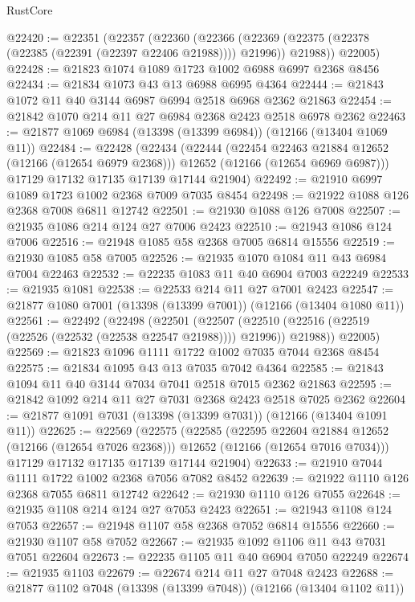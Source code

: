 \begin{lexlean}{RustCore}
\begin{coremodule}
@22420 := @22351
    (@22357
      (@22360
        (@22366 (@22369 (@22375 (@22378 (@22385 (@22391 (@22397 @22406 @21988)))) @21996)) @21988))
      @22005)
@22428 := @21823 @1074 @1089 @1723 @1002 @6988 @6997 @2368 @8456
@22434 := @21834 @1073 @43 @13 @6988 @6995 @4364
@22444 := @21843 @1072 @11 @40 @3144 @6987 @6994 @2518 @6968 @2362 @21863
@22454 := @21842 @1070 @214 @11 @27 @6984 @2368 @2423 @2518 @6978 @2362
@22463 := @21877 @1069 @6984 (@13398 (@13399 @6984)) (@12166 (@13404 @1069 @11))
@22484 := @22428
    (@22434
      (@22444
        (@22454 @22463 @21884 @12652 (@12166 (@12654 @6979 @2368)))
        @12652
        (@12166 (@12654 @6969 @6987)))
      @17129
      @17132
      @17135
      @17139
      @17144
      @21904)
@22492 := @21910 @6997 @1089 @1723 @1002 @2368 @7009 @7035 @8454
@22498 := @21922 @1088 @126 @2368 @7008 @6811 @12742
@22501 := @21930 @1088 @126 @7008
@22507 := @21935 @1086 @214 @124 @27 @7006 @2423
@22510 := @21943 @1086 @124 @7006
@22516 := @21948 @1085 @58 @2368 @7005 @6814 @15556
@22519 := @21930 @1085 @58 @7005
@22526 := @21935 @1070 @1084 @11 @43 @6984 @7004 @22463
@22532 := @22235 @1083 @11 @40 @6904 @7003 @22249
@22533 := @21935 @1081
@22538 := @22533 @214 @11 @27 @7001 @2423
@22547 := @21877 @1080 @7001 (@13398 (@13399 @7001)) (@12166 (@13404 @1080 @11))
@22561 := @22492
    (@22498
      (@22501
        (@22507 (@22510 (@22516 (@22519 (@22526 (@22532 (@22538 @22547 @21988)))) @21996)) @21988))
      @22005)
@22569 := @21823 @1096 @1111 @1722 @1002 @7035 @7044 @2368 @8454
@22575 := @21834 @1095 @43 @13 @7035 @7042 @4364
@22585 := @21843 @1094 @11 @40 @3144 @7034 @7041 @2518 @7015 @2362 @21863
@22595 := @21842 @1092 @214 @11 @27 @7031 @2368 @2423 @2518 @7025 @2362
@22604 := @21877 @1091 @7031 (@13398 (@13399 @7031)) (@12166 (@13404 @1091 @11))
@22625 := @22569
    (@22575
      (@22585
        (@22595 @22604 @21884 @12652 (@12166 (@12654 @7026 @2368)))
        @12652
        (@12166 (@12654 @7016 @7034)))
      @17129
      @17132
      @17135
      @17139
      @17144
      @21904)
@22633 := @21910 @7044 @1111 @1722 @1002 @2368 @7056 @7082 @8452
@22639 := @21922 @1110 @126 @2368 @7055 @6811 @12742
@22642 := @21930 @1110 @126 @7055
@22648 := @21935 @1108 @214 @124 @27 @7053 @2423
@22651 := @21943 @1108 @124 @7053
@22657 := @21948 @1107 @58 @2368 @7052 @6814 @15556
@22660 := @21930 @1107 @58 @7052
@22667 := @21935 @1092 @1106 @11 @43 @7031 @7051 @22604
@22673 := @22235 @1105 @11 @40 @6904 @7050 @22249
@22674 := @21935 @1103
@22679 := @22674 @214 @11 @27 @7048 @2423
@22688 := @21877 @1102 @7048 (@13398 (@13399 @7048)) (@12166 (@13404 @1102 @11))

\end{coremodule}
\end{lexlean}
